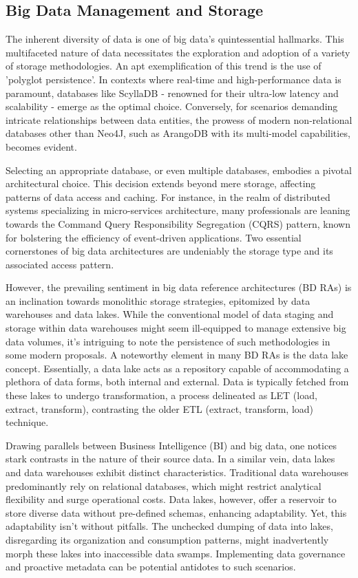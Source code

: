 \documentclass[conference]{IEEEtran}
\begin{document}
\subsection{Big Data Management and Storage}


The inherent diversity of data is one of big data's quintessential hallmarks. This multifaceted nature of data necessitates the exploration and adoption of a variety of storage methodologies. An apt exemplification of this trend is the use of 'polyglot persistence'. In contexts where real-time and high-performance data is paramount, databases like ScyllaDB - renowned for their ultra-low latency and scalability - emerge as the optimal choice. Conversely, for scenarios demanding intricate relationships between data entities, the prowess of modern non-relational databases other than Neo4J, such as ArangoDB with its multi-model capabilities, becomes evident.

Selecting an appropriate database, or even multiple databases, embodies a pivotal architectural choice. This decision extends beyond mere storage, affecting patterns of data access and caching. For instance, in the realm of distributed systems specializing in micro-services architecture, many professionals are leaning towards the Command Query Responsibility Segregation (CQRS) pattern, known for bolstering the efficiency of event-driven applications. Two essential cornerstones of big data architectures are undeniably the storage type and its associated access pattern.

However, the prevailing sentiment in big data reference architectures (BD RAs) is an inclination towards monolithic storage strategies, epitomized by data warehouses and data lakes. While the conventional model of data staging and storage within data warehouses might seem ill-equipped to manage extensive big data volumes, it's intriguing to note the persistence of such methodologies in some modern proposals. A noteworthy element in many BD RAs is the data lake concept. Essentially, a data lake acts as a repository capable of accommodating a plethora of data forms, both internal and external. Data is typically fetched from these lakes to undergo transformation, a process delineated as LET (load, extract, transform), contrasting the older ETL (extract, transform, load) technique.

Drawing parallels between Business Intelligence (BI) and big data, one notices stark contrasts in the nature of their source data. In a similar vein, data lakes and data warehouses exhibit distinct characteristics. Traditional data warehouses predominantly rely on relational databases, which might restrict analytical flexibility and surge operational costs. Data lakes, however, offer a reservoir to store diverse data without pre-defined schemas, enhancing adaptability. Yet, this adaptability isn't without pitfalls. The unchecked dumping of data into lakes, disregarding its organization and consumption patterns, might inadvertently morph these lakes into inaccessible data swamps. Implementing data governance and proactive metadata can be potential antidotes to such scenarios.
\end{document}
